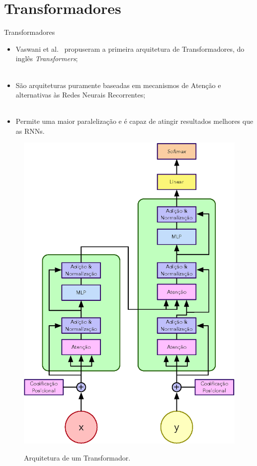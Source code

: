 \section{Transformadores}
\label{s.transformer}

\begin{frame}{Transformadores}
	\begin{itemize}
		\justifying
		\item Vaswani et al.~\cite{Vaswani:17} propuseram a primeira arquitetura de Transformadores, do inglês \emph{Transformers};
		\\~\\
		\item São arquiteturas puramente baseadas em mecanismos de Atenção e alternativas às Redes Neurais Recorrentes;	
		\\~\\
		\item Permite uma maior paralelização e é capaz de atingir resultados melhores que as RNNs.
	\end{itemize}
\end{frame}

\begin{frame}
	\vspace*{0.5cm}
	\begin{figure}[!ht]
		\centering
		\includegraphics[scale=0.45]{figs/transformer.eps}	
		\label{f.transformer}
		\caption{Arquitetura de um Transformador.}
	\end{figure}
\end{frame}

